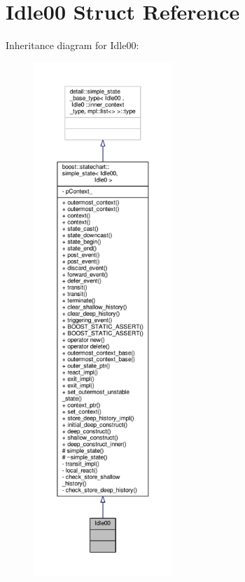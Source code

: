 \hypertarget{struct_idle00}{}\section{Idle00 Struct Reference}
\label{struct_idle00}


Inheritance diagram for Idle00\+:
\nopagebreak
\begin{figure}[H]
\begin{center}
\leavevmode
\includegraphics[height=550pt]{struct_idle00__inherit__graph}
\end{center}
\end{figure}


